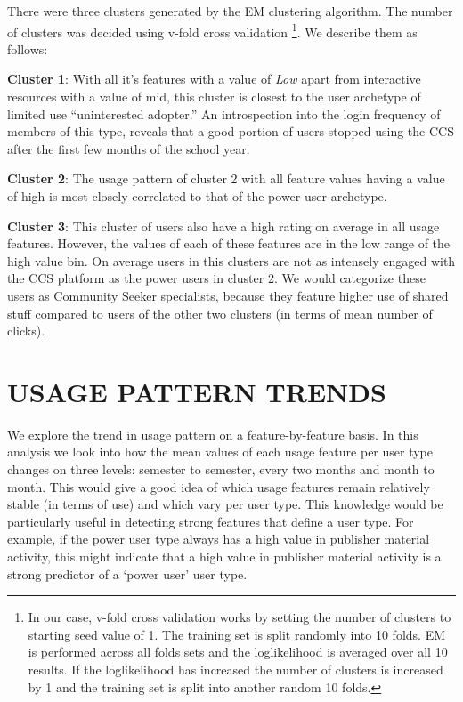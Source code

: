\documentclass{acm_proc_article-sp}
\begin{document}
There were three clusters generated by the EM clustering algorithm. The number of clusters was decided using v-fold cross validation \footnote{In our case, v-fold cross validation works by setting the number of clusters to starting seed value of 1. The training set is split randomly into 10 folds. EM is performed across all folds sets and the loglikelihood is averaged over all 10 results. If the loglikelihood has increased the number of clusters is increased by 1 and the training set is split into another random 10 folds.}. We describe them as follows:

\textbf{Cluster 1}: With all it's features with a value of \textit{Low} apart from interactive resources with a value of mid, this cluster is closest to the user archetype of limited use ``uninterested adopter.'' An introspection into the login frequency of members of this type, reveals that a good portion of users stopped using the CCS after the first few months of the school year.

\textbf{Cluster 2}: The usage pattern of cluster 2 with all feature values having a value of high is most closely correlated to that of the power user archetype.

\textbf{Cluster 3}: This cluster of users also have a high rating on average in all usage features. However, the values of each of these features are in the low range of the high value bin. On average users in this clusters are not as intensely engaged with the CCS platform as the power users in cluster 2. We would categorize these users as Community Seeker specialists, because they feature higher use of shared stuff compared to users of the other two clusters (in terms of mean number of clicks).

\section{USAGE PATTERN TRENDS}
We explore the trend in usage pattern on a feature-by-feature basis. In this analysis we look into how the mean values of each usage feature per user type changes on three levels: semester to semester, every two months and month to month. This would give a good idea of which usage features remain relatively stable (in terms of use) and which vary per user type. This knowledge would be particularly useful in detecting strong features that define a user type. For example, if the power user type always has a high value in  publisher material activity, this  might indicate that a high value in publisher material activity is a strong predictor of a `power user' user type.
\end{document}

